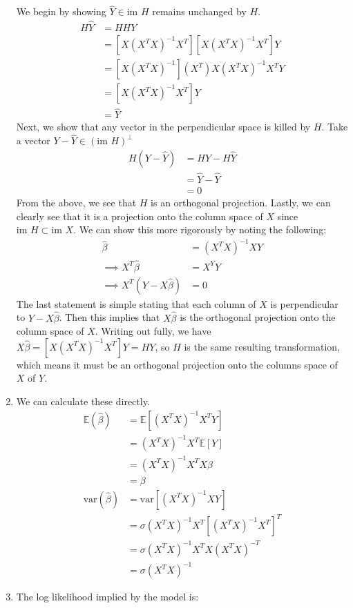 \documentclass[submit]{harvardml}
\newcommand{\E}{\mathbb{E}}
\newcommand{\var}{\text{var}}
\theoremstyle{plain}
\begin{document}
\begin{enumerate}[label=(\alph*)]
We begin by showing $\hat{Y} \in \text{im } H$ remains unchanged by $H$.
\begin{align*}
H\hat{Y} &= HHY \\
&= [X(X^TX)^{-1}X^T][X(X^TX)^{-1}X^T]Y \\
&= [X(X^TX)^{-1}](X^T)X(X^TX)^{-1}X^TY \\
&= [X(X^TX)^{-1}X^T]Y \\
&= \hat{Y}
\end{align*}
Next, we show that any vector in the perpendicular space is killed by $H$. Take a vector $Y - \hat{Y} \in (\text{im } H)^{\bot}$
\begin{align*}
H(Y - \hat{Y}) &= HY - H\hat{Y} \\
&= \hat{Y} - \hat{Y}\\
&= 0
\end{align*}
From the above, we see that $H$ is an orthogonal projection. Lastly, we can clearly see that it is a projection onto the column space of $X$ since $\text{im } H \subset \text{im } X$. We can show this more rigorously by noting the following:
\begin{align*}
\hat{\beta} &= (X^TX)^{-1}XY \\
\implies X^T\hat{\beta} &= X^YY \\
\implies X^T(Y - X\hat{\beta}) &= 0
\end{align*}
The last statement is simple stating that each column of $X$ is perpendicular to $Y - X\hat{\beta}$. Then this implies that $X\hat{\beta}$ is the orthogonal projection onto the column space of $X$. Writing out fully, we have $X\hat{\beta} = [X(X^TX)^{-1}X^T]Y = HY$, so $H$ is the same resulting transformation, which means it must be an orthogonal projection onto the columns space of $X$ of $Y$.
\item We can calculate these directly.
\begin{align*}
\E(\hat{\beta}) &= \E[(X^TX)^{-1}X^TY] \\
&= (X^TX)^{-1}X^T\E[Y] \\
&= (X^TX)^{-1}X^TX\beta \\
&= \beta \\
\var({\hat{\beta}}) &= \var[(X^TX)^{-1}XY] \\
 &= \sigma(X^TX)^{-1}X^T[(X^TX)^{-1}X^T]^T \\
 &= \sigma(X^TX)^{-1}X^TX(X^TX)^{-T} \\
 &= \sigma(X^TX)^{-1}
\end{align*}
\item The log likelihood implied by the model is:

\end{enumerate}
\end{document}
